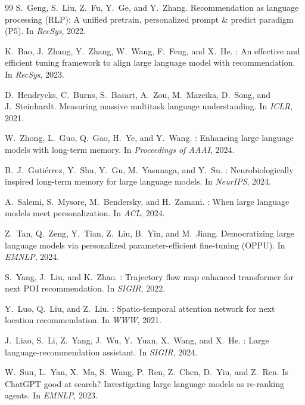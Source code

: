\documentclass[sigconf,review,anonymous]{acmart}
\begin{document}
\begin{thebibliography}{99}
S.~Geng, S.~Liu, Z.~Fu, Y.~Ge, and Y.~Zhang.
\newblock Recommendation as language processing ({RLP}): A unified pretrain, personalized prompt \& predict paradigm ({P5}).
\newblock In \textit{RecSys}, 2022.

K.~Bao, J.~Zhang, Y.~Zhang, W.~Wang, F.~Feng, and X.~He.
: An effective and efficient tuning framework to align large language model with recommendation.
\newblock In \textit{RecSys}, 2023.

D.~Hendrycks, C.~Burns, S.~Basart, A.~Zou, M.~Mazeika, D.~Song, and J.~Steinhardt.
\newblock Measuring massive multitask language understanding.
\newblock In \textit{ICLR}, 2021.

W.~Zhong, L.~Guo, Q.~Gao, H.~Ye, and Y.~Wang.
: Enhancing large language models with long-term memory.
\newblock In \textit{Proceedings of AAAI}, 2024.

B.~J.~Guti\'errez, Y.~Shu, Y.~Gu, M.~Yasunaga, and Y.~Su.
: Neurobiologically inspired long-term memory for large language models.
\newblock In \textit{NeurIPS}, 2024.

A.~Salemi, S.~Mysore, M.~Bendersky, and H.~Zamani.
: When large language models meet personalization.
\newblock In \textit{ACL}, 2024.

Z.~Tan, Q.~Zeng, Y.~Tian, Z.~Liu, B.~Yin, and M.~Jiang.
\newblock Democratizing large language models via personalized parameter-efficient fine-tuning ({OPPU}).
\newblock In \textit{EMNLP}, 2024.

S.~Yang, J.~Liu, and K.~Zhao.
: Trajectory flow map enhanced transformer for next {POI} recommendation.
\newblock In \textit{SIGIR}, 2022.

Y.~Luo, Q.~Liu, and Z.~Liu.
: Spatio-temporal attention network for next location recommendation.
\newblock In \textit{WWW}, 2021.

J.~Liao, S.~Li, Z.~Yang, J.~Wu, Y.~Yuan, X.~Wang, and X.~He.
: Large language-recommendation assistant.
\newblock In \textit{SIGIR}, 2024.

W.~Sun, L.~Yan, X.~Ma, S.~Wang, P.~Ren, Z.~Chen, D.~Yin, and Z.~Ren.
\newblock Is {ChatGPT} good at search? {Investigating} large language models as re-ranking agents.
\newblock In \textit{EMNLP}, 2023.


\end{thebibliography}
\end{document}
